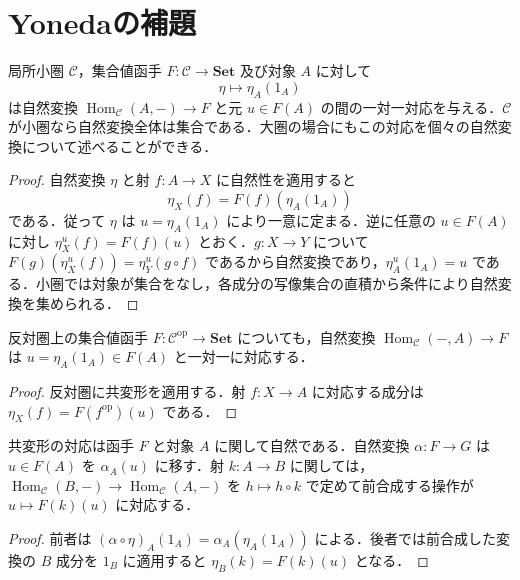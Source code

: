 \section{Yonedaの補題}
\begin{prop}
局所小圏 $\mathcal C$，集合値函手 $F:\mathcal C\to\mathbf{Set}$ 及び対象 $A$ に対して
\[
 \eta\longmapsto\eta_A(1_A)
\]
は自然変換 $\operatorname{Hom}_{\mathcal C}(A,-)\to F$ と元 $u\in F(A)$ の間の一対一対応を与える．$\mathcal C$ が小圏なら自然変換全体は集合である．大圏の場合にもこの対応を個々の自然変換について述べることができる．
\end{prop}
\begin{proof}
自然変換 $\eta$ と射 $f:A\to X$ に自然性を適用すると
\[
 \eta_X(f)=F(f)(\eta_A(1_A))
\]
である．従って $\eta$ は $u=\eta_A(1_A)$ により一意に定まる．逆に任意の $u\in F(A)$ に対し $\eta_X^u(f)=F(f)(u)$ とおく．$g:X\to Y$ について $F(g)(\eta_X^u(f))=\eta_Y^u(g\circ f)$ であるから自然変換であり，$\eta_A^u(1_A)=u$ である．小圏では対象が集合をなし，各成分の写像集合の直積から条件により自然変換を集められる．
\end{proof}
\begin{prop}
反対圏上の集合値函手 $F:\mathcal C^{\mathrm{op}}\to\mathbf{Set}$ についても，自然変換 $\operatorname{Hom}_{\mathcal C}(-,A)\to F$ は $u=\eta_A(1_A)\in F(A)$ と一対一に対応する．
\end{prop}
\begin{proof}
反対圏に共変形を適用する．射 $f:X\to A$ に対応する成分は $\eta_X(f)=F(f^{\mathrm{op}})(u)$ である．
\end{proof}
\begin{prop}[Yoneda対応の自然性]
共変形の対応は函手 $F$ と対象 $A$ に関して自然である．自然変換 $\alpha:F\to G$ は $u\in F(A)$ を $\alpha_A(u)$ に移す．射 $k:A\to B$ に関しては，$\operatorname{Hom}_{\mathcal C}(B,-)\to\operatorname{Hom}_{\mathcal C}(A,-)$ を $h\mapsto h\circ k$ で定めて前合成する操作が $u\mapsto F(k)(u)$ に対応する．
\end{prop}
\begin{proof}
前者は $(\alpha\circ\eta)_A(1_A)=\alpha_A(\eta_A(1_A))$ による．後者では前合成した変換の $B$ 成分を $1_B$ に適用すると $\eta_B(k)=F(k)(u)$ となる．
\end{proof}
